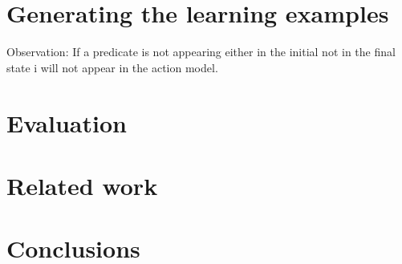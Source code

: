 \documentclass[letterpaper]{article} %
\begin{document}
\section{Generating the learning examples}
Observation: If a predicate is not appearing either in the initial not in the final state i will not appear in the action model. 


\section{Evaluation}

\section{Related work}

\section{Conclusions}

\end{document}
